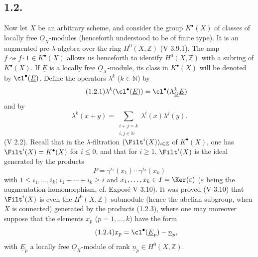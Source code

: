 \subsection*{1.2.}
Now let $X$ be an arbitrary scheme, and consider the group $K^{\bullet}(X)$ of classes of locally free $\underline{O}_X$-modules (henceforth understood to be of finite type). It is an augmented pre-$\lambda$-algebra over the ring $H^0(X,\mathbb Z)$ (V 3.9.1). The map $f\rightsquigarrow f\cdot1\in K^{\bullet}(X)$ allows us henceforth to identify $H^0(X,\mathbb Z)$ with a subring of $K^{\bullet}(X)$. If $\underline{E}$ is a locally free $\underline{O}_X$-module, its class in $K^{\bullet}(X)$ will be denoted by $\cl^{\bullet}(\underline{E})$. Define the operators $\lambda^k$ ($k\in\mathbb N$) by
\begin{equation}\tag{1.2.1}
\lambda^k(\cl^{\bullet}(\underline{E}))=\cl^{\bullet}(\Lambda_{\underline{O}}^k\underline{E})
\end{equation}
and by
\begin{equation}\tag{1.2.2}
\lambda^k(x+y)=\sum_{\substack{i+j=k\\ i,j\in\mathbb N}}\lambda^i(x)\lambda^j(y).
\end{equation}
(V 2.2). Recall that in the $\lambda$-filtration $(\Filt^i(X))_{i\in\mathbb Z}$ of $K^{\bullet}(X)$, one has $\Filt^i(X)=K^{\bullet}(X)$ for $i\leq0$, and that for $i\geq1$, $\Filt^i(X)$ is the ideal generated by the products
\begin{equation}\tag{1.2.3}
P=\gamma^{i_1}(x_1)\cdots\gamma^{i_k}(x_k)
\end{equation}
with $1\leq i_1,\ldots,i_k$; $i_1+\cdots+i_k\geq i$ and $x_1,\ldots,x_k\in I=\Ker(\varepsilon)$ ($\varepsilon$ being the augmentation homomorphism, cf. Exposé V 3.10). It was proved (V 3.10) that $\Filt^i(X)$ is even the $H^0(X,\mathbb Z)$-submodule (hence the abelian subgroup, when $X$ is connected) generated by the products (1.2.3), where one may moreover suppose that the elements $x_p$ ($p=1,\ldots,k$) have the form
\begin{equation}\tag{1.2.4}
x_p=\cl^{\bullet}(\underline{E}_p)-\underline{n}_p,
\end{equation}
with $\underline{E}_p$ a locally free $\underline{O}_X$-module of rank $\underline{n}_p\in H^0(X,\mathbb Z)$.


%

